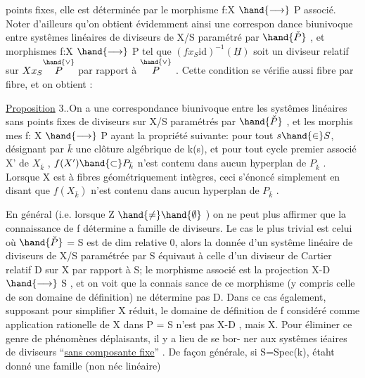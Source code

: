 
points fixes, elle est déterminée  par le morphisme f:X $\hand{\longrightarrow}$ P
associé. Noter d'ailleurs qu'on obtient évidemment ainsi une correspon
dance biunivoque entre systêmes linéaires de diviseurs de X/S paramétré
par $\hand{\check{P}}$ , et morphismes f:X $\hand{\longrightarrow}$ P tel que $(fx_S\mathrm{id})^{-1}(\underline{H})$ soit un
diviseur  relatif sur $Xx_S\overset{\hand{\vee}}{P}$ par rapport à $\overset{\hand{\vee}}{P}$ . Cette  condition
se vérifie aussi fibre par fibre, et on obtient :

\uline{Proposition} 3..On a une correspondance biunivoque entre les 
systêmes linéaires sans points fixes de diviseurs sur X/S paramétrés par $\hand{\check{P}}$ , et les morphis
mes f: X $\hand{\longrightarrow}$ P ayant la propriété suivante: pour tout $s\hand{\in} S$, désignant
par $\bar{k}$ une clôture algébrique de k(s), et pour tout cycle premier associé
X' de $X_{\bar{k}}$ , $f(X')\hand{\subset} P_{\bar{k}}$ n'est contenu dans aucun hyperplan de $P_{\bar{k}}$ .
\hand{(}Lorsque X est à fibres géométriquement  intègres, ceci 
 s'énoncé simplement en disant que $f(X_{\bar{k}})$ n'est contenu dans aucun
hyperplan de $P_{\bar{k}}$ \hand{)}.

En général (i.e.  lorsque Z $\hand{\neq}\hand{\emptyset}$ ) on ne peut plus affirmer que
la connaissance de f détermine a famille de diviseurs. Le cas le plus
trivial est celui où $\hand{\check{P}}$ = S est de dim relative 0, alors la donnée d'un systême linéaire de
diviseurs de X/S paramétrée par S équivaut à celle d'un diviseur de
Cartier relatif D sur X par rapport à S;  le morphisme
associé est la projection X-D $\hand{\longrightarrow}$ S , et on voit  que la connais
sance de ce morphisme (y compris celle de son domaine de définition)
ne détermine pas D. Dans ce cas également, supposant pour simplifier X
réduit, le domaine de définition de  f  considéré
comme application rationelle de X dans P = S n'est pas X-D , mais X.
Pour éliminer ce genre de phénomènes déplaisants, il y a lieu de se bor-%
ner aux systêmes iéaires de diviseurs ``\uline{sans composante fixe}'' . De
façon générale, si S=Spec(k), étaht donné une famille (non néc linéaire)


